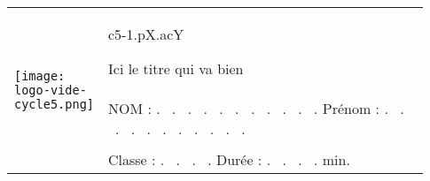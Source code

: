 \documentclass[12pt,a4paper,notitlepage]{article}
\author{F.G.}
\title{}
\begin{document}
\begin{flushleft}
\begin{tabular}{| m{0.15\linewidth} m{0.78\linewidth} |}
	\hline
	\multirow{4}{*}{\texttt{[image: logo-vide-cycle5.png]}}	
	& c5-1.pX.acY
	\begin{LARGE}
	Ici le titre qui va bien
	\end{LARGE} \\ [0.5ex]
	\cline{2-2}
	 & NOM : . \ . \ . \ . \ . \ . \ . \ . \ . \ . \ . Prénom : . \ . \ . \ . \ . \ . \ . \ . \ . \ . \ . \\
	 & \\
	 & Classe : . \ . \ . \ . Durée : . \ . \ . \ . min. \\ [1ex]
	\hline
\end{tabular}



\end{flushleft}
\end{document}
